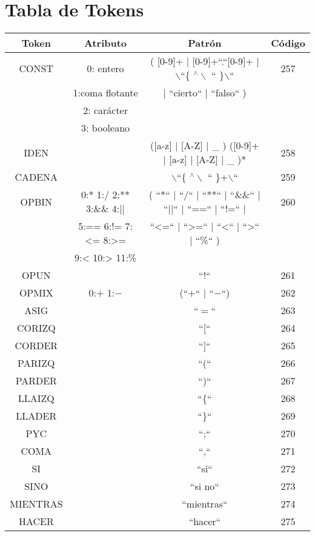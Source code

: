\newpage
\section{Tabla de Tokens}

\begin{table}[H]
\centering
\begin{tabular}{| c | c | c | c |}
  \hline
  Token & Atributo & Patrón & Código \\ \hline
  CONST & 0: entero & ( [0-9]+ | [0-9]+``.``[0-9]+ | $\backslash$``\{  $^\wedge \backslash$ `` \}$\backslash$``  & 257 \\
  & 1:coma flotante & | ``cierto`` | ``falso`` ) &  \\
  & 2: carácter & & \\
  & 3: booleano &  & \\ \hline
  IDEN & & ([a-z] | [A-Z] | \_ ) ([0-9]+ | [a-z] | [A-Z] | \_ )* & 258 \\ \hline
  CADENA & &  $\backslash$``\{  $^\wedge \backslash$ `` \}+$\backslash$``& 259 \\ \hline
  OPBIN & 0:*  1:/  2:**  3:\&\& 4:|| & ( ``*``  |  ``/``  |  ``**``  |  ``\&\&``  |  ``||`` |  ``==`` |  ``$!$=``  |   & 260 \\
  &   5:== 6:!= 7:\textless{}= 8:>=   & ``\textless{}=``  |  ``\textgreater=``  |  ``\textless`` |  ``\textgreater``  |  ``\%``  )& \\
  & 9:< 10:> 11:\% & & \\ \hline
OPUN & & ``$!$`` &  261 \\ \hline
OPMIX & 0:$+$ 1:$-$ & (``$+$`` | ``$-$``) & 262 \\ \hline
ASIG &  & ``$=$`` & 263 \\ \hline
CORIZQ & & ``[`` & 264 \\ \hline
CORDER & & ``]`` & 265\\ \hline
PARIZQ & & ``(`` & 266\\ \hline
PARDER & & ``)`` & 267\\ \hline
LLAIZQ & & ``\{`` & 268\\ \hline
LLADER & & ``\}`` & 269\\ \hline
PYC & & ``;`` & 270\\ \hline
COMA & & ``,`` & 271\\ \hline
SI & & ``si`` & 272\\ \hline
SINO & & ``si no`` & 273\\ \hline
MIENTRAS & & ``mientras`` & 274\\ \hline
HACER& & ``hacer`` & 275\\ \hline

\end{tabular}
\end{table}
